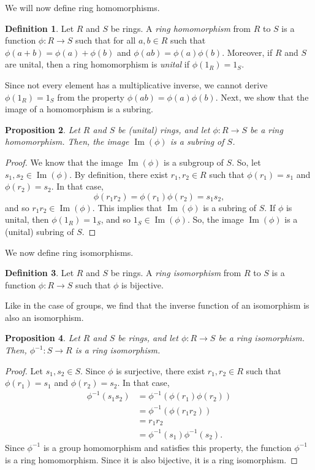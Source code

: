 \documentclass[a4paper, openany]{memoir}
\theoremstyle{definition}
\newtheorem{definition}{Definition}[section]
\theoremstyle{plain}
\newtheorem{proposition}[definition]{Proposition}
\begin{document}
We will now define ring homomorphisms.
\begin{definition}
Let $R$ and $S$ be rings. A \emph{ring homomorphism} from $R$ to $S$ is a function $\phi: R \to S$ such that for all $a, b \in R$ such that $\phi(a + b) = \phi(a) + \phi(b)$ and $\phi(ab) = \phi(a) \phi(b)$. Moreover, if $R$ and $S$ are unital, then a ring homomorphism is \emph{unital} if $\phi(1_R) = 1_S$.
\end{definition}
\noindent Since not every element has a multiplicative inverse, we cannot derive $\phi(1_R) = 1_S$ from the property $\phi(ab) = \phi(a) \phi(b)$. Next, we show that the image of a homomorphism is a subring.
\begin{proposition}
Let $R$ and $S$ be (unital) rings, and let $\phi: R \to S$ be a ring homomorphism. Then, the image $\operatorname{Im}(\phi)$ is a subring of $S$.
\end{proposition}
\begin{proof}
We know that the image $\operatorname{Im}(\phi)$ is a subgroup of $S$. So, let $s_1, s_2 \in \operatorname{Im}(\phi)$. By definition, there exist $r_1, r_2 \in R$ such that $\phi(r_1) = s_1$ and $\phi(r_2) = s_2$. In that case,
\[\phi(r_1r_2) = \phi(r_1) \phi(r_2) = s_1 s_2,\]
and so $r_1r_2 \in \operatorname{Im}(\phi)$. This implies that $\operatorname{Im}(\phi)$ is a subring of $S$. If $\phi$ is unital, then $\phi(1_R) = 1_S$, and so $1_S \in \operatorname{Im}(\phi)$. So, the image $\operatorname{Im}(\phi)$ is a (unital) subring of $S$.
\end{proof}
We now define ring isomorphisms.
\begin{definition}
Let $R$ and $S$ be rings. A \emph{ring isomorphism} from $R$ to $S$ is a function $\phi: R \to S$ such that $\phi$ is bijective.
\end{definition}
\noindent Like in the case of groups, we find that the inverse function of an isomorphism is also an isomorphism.
\begin{proposition}
Let $R$ and $S$ be rings, and let $\phi: R \to S$ be a ring isomorphism. Then, $\phi^{-1}: S \to R$ is a ring isomorphism.
\end{proposition}
\begin{proof}
Let $s_1, s_2 \in S$. Since $\phi$ is surjective, there exist $r_1, r_2 \in R$ such that $\phi(r_1) = s_1$ and $\phi(r_2) = s_2$. In that case,
\begin{align*}
    \phi^{-1}(s_1 s_2) &= \phi^{-1}(\phi(r_1) \phi(r_2)) \\
    &= \phi^{-1}(\phi(r_1r_2)) \\
    &= r_1r_2 \\
    &= \phi^{-1}(s_1) \phi^{-1}(s_2).
\end{align*}
Since $\phi^{-1}$ is a group homomorphism and satisfies this property, the function $\phi^{-1}$ is a ring homomorphism. Since it is also bijective, it is a ring isomorphism.
\end{proof}
\end{document}
